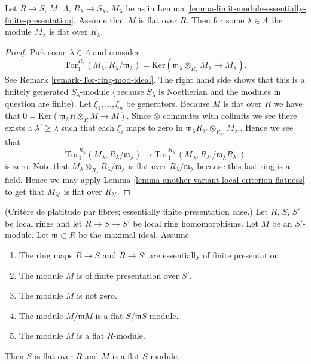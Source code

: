 \begin{lemma}
\label{lemma-colimit-eventually-flat}
Let $R \to S$, $M$, $\Lambda$, $R_\lambda \to S_\lambda$, $M_\lambda$
be as in Lemma \ref{lemma-limit-module-essentially-finite-presentation}.
Assume that $M$ is flat over $R$.
Then for some $\lambda \in \Lambda$ the module
$M_\lambda$ is flat over $R_\lambda$.
\end{lemma}

\begin{proof}
Pick some $\lambda \in \Lambda$ and consider
$$
\text{Tor}_1^{R_\lambda}(M_\lambda, R_\lambda/\mathfrak m_\lambda)
=
\text{Ker}(\mathfrak m_\lambda \otimes_{R_\lambda} M_\lambda
\to M_\lambda).
$$
See Remark \ref{remark-Tor-ring-mod-ideal}. The right hand side
shows that this is a finitely generated $S_\lambda$-module (because
$S_\lambda$ is Noetherian and the modules in question are finite).
Let $\xi_1, \ldots, \xi_n$ be generators.
Because $M$ is flat over $R$ we
have that $0 = \text{Ker}(\mathfrak m_\lambda R \otimes_R M \to M)$.
Since $\otimes$ commutes with colimits we see there exists
a $\lambda' \geq \lambda$ such that each $\xi_i$ maps to
zero in
$\mathfrak m_{\lambda}R_{\lambda'} \otimes_{R_{\lambda'}} M_{\lambda'}$.
Hence we see that
$$
\text{Tor}_1^{R_\lambda}(M_\lambda, R_\lambda/\mathfrak m_\lambda)
\longrightarrow
\text{Tor}_1^{R_{\lambda'}}(M_\lambda,
R_{\lambda'}/\mathfrak m_{\lambda}R_{\lambda'})
$$
is zero. Note that
$M_\lambda \otimes_{R_\lambda} R_\lambda/\mathfrak m_\lambda$
is flat over $R_\lambda/\mathfrak m_\lambda$ because this last
ring is a field. Hence we may apply Lemma
\ref{lemma-another-variant-local-criterion-flatness}
to get that $M_{\lambda'}$ is flat over $R_{\lambda'}$.
\end{proof}

\begin{lemma}
\label{lemma-criterion-flatness-fibre}
(Crit\`ere de platitude par fibres; essentially finite presentation case.)
Let $R$, $S$, $S'$ be local rings and let $R \to S \to S'$ be local ring
homomorphisms. Let $M$ be an $S'$-module. Let $\mathfrak m \subset R$
be the maximal ideal. Assume
\begin{enumerate}
\item The ring maps $R \to S$ and $R \to S'$ are essentially
of finite presentation.
\item The module $M$ is of finite presentation over $S'$.
\item The module $M$ is not zero.
\item The module $M/\mathfrak mM$ is a flat $S/\mathfrak mS$-module.
\item The module $M$ is a flat $R$-module.
\end{enumerate}
Then $S$ is flat over $R$ and $M$ is a flat $S$-module.
\end{lemma}

